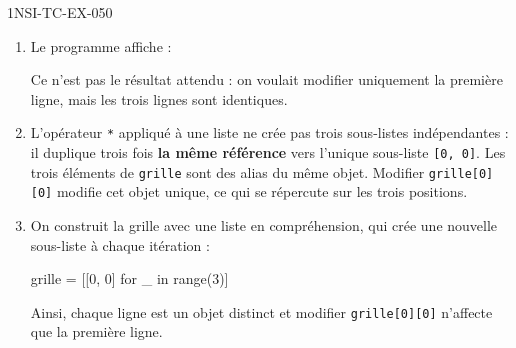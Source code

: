 \begin{corrige}{1NSI-TC-EX-050}
\begin{enumerate}
  \item Le programme affiche :
\begin{console}
[1, 0]
[1, 0]
[1, 0]
\end{console}
Ce n'est pas le résultat attendu : on voulait modifier uniquement la première ligne, mais les trois lignes sont identiques.

  \item L'opérateur \lstinline{*} appliqué à une liste ne crée pas trois sous-listes indépendantes : il duplique trois fois \textbf{la même référence} vers l'unique sous-liste \lstinline{[0, 0]}. Les trois éléments de \lstinline{grille} sont des alias du même objet. Modifier \lstinline{grille[0][0]} modifie cet objet unique, ce qui se répercute sur les trois positions.

  \item On construit la grille avec une liste en compréhension, qui crée une nouvelle sous-liste à chaque itération :
\begin{python}
grille = [[0, 0] for _ in range(3)]
\end{python}
Ainsi, chaque ligne est un objet distinct et modifier \lstinline{grille[0][0]} n'affecte que la première ligne.
\end{enumerate}
\end{corrige}
